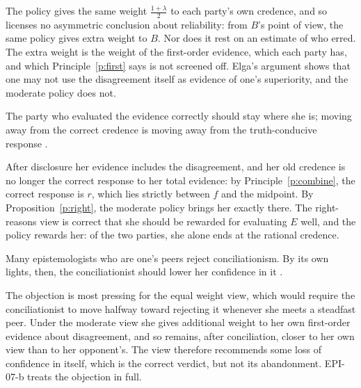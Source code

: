 \documentclass{situationist-preprint}
\begin{document}
\begin{reply}
The policy gives the same weight $\frac{1+\lambda}{2}$ to each party's own credence, and so licenses no asymmetric conclusion about reliability: from $B$'s point of view, the same policy gives extra weight to $B$. Nor does it rest on an estimate of who erred. The extra weight is the weight of the first-order evidence, which each party has, and which Principle~\ref{p:first} says is not screened off. Elga's argument shows that one may not use the disagreement itself as evidence of one's superiority, and the moderate policy does not.
\end{reply}

\begin{objection}
The party who evaluated the evidence correctly should stay where she is; moving away from the correct credence is moving away from the truth-conducive response \citep{Kelly2005}.
\end{objection}

\begin{reply}
After disclosure her evidence includes the disagreement, and her old credence is no longer the correct response to her total evidence: by Principle~\ref{p:combine}, the correct response is $r$, which lies strictly between $f$ and the midpoint. By Proposition~\ref{p:right}, the moderate policy brings her exactly there. The right-reasons view is correct that she should be rewarded for evaluating $E$ well, and the policy rewards her: of the two parties, she alone ends at the rational credence.
\end{reply}

\begin{objection}
Many epistemologists who are one's peers reject conciliationism. By its own lights, then, the conciliationist should lower her confidence in it \citep{Elga2010}.
\end{objection}

\begin{reply}
The objection is most pressing for the equal weight view, which would require the conciliationist to move halfway toward rejecting it whenever she meets a steadfast peer. Under the moderate view she gives additional weight to her own first-order evidence about disagreement, and so remains, after conciliation, closer to her own view than to her opponent's. The view therefore recommends some loss of confidence in itself, which is the correct verdict, but not its abandonment. EPI-07-b treats the objection in full.
\end{reply}
\end{document}
